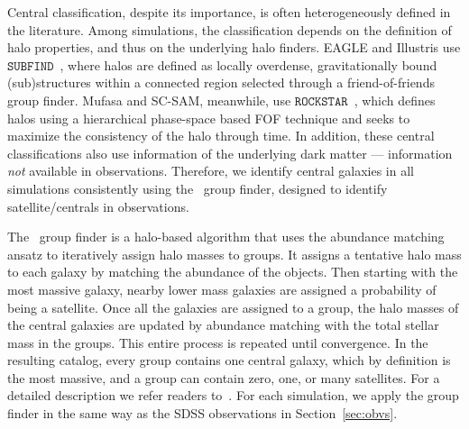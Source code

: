 \documentclass[tighten, preprint]{aastex62}
\begin{document}
Central classification, despite its importance, is often 
heterogeneously defined in the literature. Among simulations, the 
classification depends on the definition of halo properties, 
and thus on the underlying halo finders. EAGLE and Illustris use 
$\mathtt{SUBFIND}$~\citep{springel2001}, where halos are defined as 
locally overdense, gravitationally bound (sub)structures within a 
connected region selected through a 
friend-of-friends~\citep[FOF;][]{davis1985} group finder. {\sc Mufasa} 
and SC-SAM, meanwhile, 
{\color{red} use} 
$\mathtt{ROCKSTAR}$~\citep{behroozi2013}, which defines halos using a
hierarchical phase-space based FOF technique and seeks to maximize 
the consistency of the halo through time. In addition, these central 
classifications also use information of the underlying dark 
matter --- information {\em not} available in observations. Therefore, 
we identify central galaxies in all simulations consistently using %
the~\cite{tinker2011} group finder, designed to identify satellite/centrals 
in observations. 

The~\cite{tinker2011} group finder is a halo-based algorithm that uses 
the abundance matching ansatz to iteratively assign halo masses to groups. 
It assigns a tentative halo mass to each galaxy by matching the abundance 
of the objects. Then starting with the most massive galaxy, nearby lower
mass galaxies are assigned a probability of being a satellite. Once all 
the galaxies are assigned to a group, the halo masses of the central galaxies 
are updated by abundance matching with the total stellar mass in the groups. 
This entire process is repeated until convergence. In the resulting catalog, 
every group contains one central galaxy, which by definition is the 
most massive, and a group can contain zero, one, or many satellites.
For a detailed description we refer readers to~\cite{tinker2011,wetzel2012}. 
{\color{red} 
For each simulation, we apply the group finder in the same way as the SDSS 
observations in Section~\ref{sec:obvs}. 
}
\end{document}
